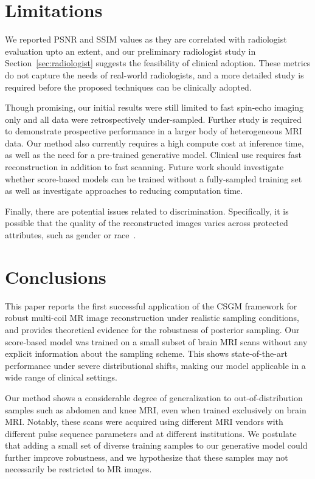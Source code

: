 \section{Limitations}\label{sec:limitations}
We reported PSNR and SSIM values as they are correlated with radiologist evaluation upto an extent, and our preliminary radiologist study in Section~\ref{sec:radiologist} suggests the feasibility of clinical adoption.
These metrics do not capture the needs of real-world radiologists, and a more detailed study is required before the proposed techniques can be clinically adopted. 

Though promising, our initial results were still limited to fast spin-echo imaging only and all data were retrospectively under-sampled. Further study is required to demonstrate prospective performance in a larger body of heterogeneous MRI data. Our method also currently requires a high compute cost at inference time, as well as the need for a pre-trained generative model. Clinical use requires fast reconstruction in addition to fast scanning. Future work should investigate whether score-based models can be trained without a fully-sampled training set as well as investigate approaches to reducing computation time.

Finally, there are potential issues related to discrimination. Specifically, it is possible that the quality of the reconstructed images varies across protected attributes, such as gender or race~\cite{larrazabal2020gender}.

\section{Conclusions}
This paper reports the first successful application of the CSGM framework for robust multi-coil MR image reconstruction under realistic sampling conditions, and provides theoretical evidence for the robustness of posterior sampling. Our score-based model was trained on a small subset of brain MRI scans without any explicit information about the sampling scheme. This shows state-of-the-art performance under severe distributional shifts, making our model applicable in a wide range of clinical settings. 

Our method shows a considerable degree of generalization to out-of-distribution samples such as abdomen and knee MRI, even when trained exclusively on brain MRI. Notably, these scans were acquired using different MRI vendors with different pulse sequence parameters and at different institutions. We postulate that adding a small set of diverse training samples to our generative model could further improve robustness, and we hypothesize that these samples may not necessarily be restricted to MR images.

